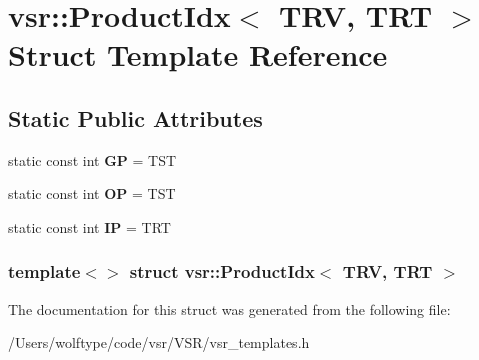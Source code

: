 \hypertarget{structvsr_1_1_product_idx_3_01_t_r_v_00_01_t_r_t_01_4}{\section{vsr\-:\-:Product\-Idx$<$ T\-R\-V, T\-R\-T $>$ Struct Template Reference}
\label{structvsr_1_1_product_idx_3_01_t_r_v_00_01_t_r_t_01_4}
}
\subsection*{Static Public Attributes}
\begin{DoxyCompactItemize}
\item 
\hypertarget{structvsr_1_1_product_idx_3_01_t_r_v_00_01_t_r_t_01_4_ab9baab2d94637afb1cbcf375a530d663}{static const int {\bfseries G\-P} = T\-S\-T}\label{structvsr_1_1_product_idx_3_01_t_r_v_00_01_t_r_t_01_4_ab9baab2d94637afb1cbcf375a530d663}

\item 
\hypertarget{structvsr_1_1_product_idx_3_01_t_r_v_00_01_t_r_t_01_4_a3228df87da6bb505ef2ae1a09f85b9fe}{static const int {\bfseries O\-P} = T\-S\-T}\label{structvsr_1_1_product_idx_3_01_t_r_v_00_01_t_r_t_01_4_a3228df87da6bb505ef2ae1a09f85b9fe}

\item 
\hypertarget{structvsr_1_1_product_idx_3_01_t_r_v_00_01_t_r_t_01_4_a640215346181d3c9b62c201de67e0d5b}{static const int {\bfseries I\-P} = T\-R\-T}\label{structvsr_1_1_product_idx_3_01_t_r_v_00_01_t_r_t_01_4_a640215346181d3c9b62c201de67e0d5b}

\end{DoxyCompactItemize}
\subsubsection*{template$<$$>$ struct vsr\-::\-Product\-Idx$<$ T\-R\-V, T\-R\-T $>$}



The documentation for this struct was generated from the following file\-:\begin{DoxyCompactItemize}
\item 
/\-Users/wolftype/code/vsr/\-V\-S\-R/vsr\-\_\-templates.\-h\end{DoxyCompactItemize}
